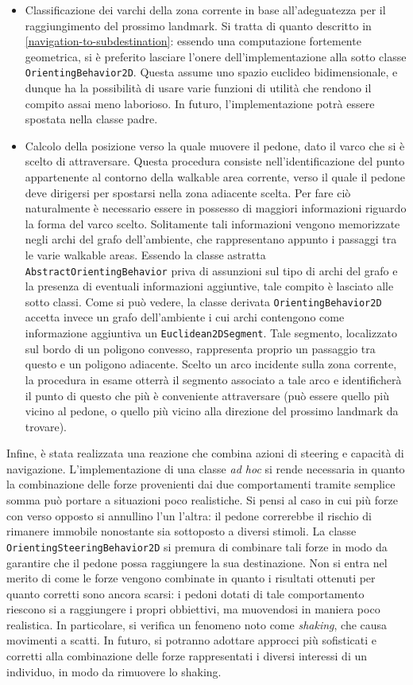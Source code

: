 \documentclass[12pt,a4paper,openright,oneside]{book}
\begin{document}
\begin{itemize}
    \item Classificazione dei varchi della zona corrente in base all'adeguatezza per il raggiungimento del prossimo landmark. Si tratta di quanto descritto in \ref{navigation-to-subdestination}: essendo una computazione fortemente geometrica, si è preferito lasciare l'onere dell'implementazione alla sotto classe \texttt{OrientingBehavior2D}. Questa assume uno spazio euclideo bidimensionale, e dunque ha la possibilità di usare varie funzioni di utilità che rendono il compito assai meno laborioso. In futuro, l'implementazione potrà essere spostata nella classe padre.
    \item Calcolo della posizione verso la quale muovere il pedone, dato il varco che si è scelto di attraversare. Questa procedura consiste nell'identificazione del punto appartenente al contorno della walkable area corrente, verso il quale il pedone deve dirigersi per spostarsi nella zona adiacente scelta. Per fare ciò naturalmente è necessario essere in possesso di maggiori informazioni riguardo la forma del varco scelto. Solitamente tali informazioni vengono memorizzate negli archi del grafo dell'ambiente, che rappresentano appunto i passaggi tra le varie walkable areas. Essendo la classe astratta \texttt{AbstractOrientingBehavior} priva di assunzioni sul tipo di archi del grafo e la presenza di eventuali informazioni aggiuntive, tale compito è lasciato alle sotto classi. Come si può vedere, la classe derivata \texttt{OrientingBehavior2D} accetta invece un grafo dell'ambiente i cui archi contengono come informazione aggiuntiva un \texttt{Euclidean2DSegment}. Tale segmento, localizzato sul bordo di un poligono convesso, rappresenta proprio un passaggio tra questo e un poligono adiacente. Scelto un arco incidente sulla zona corrente, la procedura in esame otterrà il segmento associato a tale arco e identificherà il punto di questo che più è conveniente attraversare (può essere quello più vicino al pedone, o quello più vicino alla direzione del prossimo landmark da trovare).
\end{itemize}
Infine, è stata realizzata una reazione che combina azioni di steering e capacità di navigazione. L'implementazione di una classe \emph{ad hoc} si rende necessaria in quanto la combinazione delle forze provenienti dai due comportamenti tramite semplice somma può portare a situazioni poco realistiche. Si pensi al caso in cui più forze con verso opposto si annullino l'un l'altra: il pedone correrebbe il rischio di rimanere immobile nonostante sia sottoposto a diversi stimoli. La classe \texttt{OrientingSteeringBehavior2D} si premura di combinare tali forze in modo da garantire che il pedone possa raggiungere la sua destinazione. Non si entra nel merito di come le forze vengono combinate in quanto i risultati ottenuti per quanto corretti sono ancora scarsi: i pedoni dotati di tale comportamento riescono si a raggiungere i propri obbiettivi, ma muovendosi in maniera poco realistica. In particolare, si verifica un fenomeno noto come \emph{shaking}, che causa movimenti a scatti. In futuro, si potranno adottare approcci più sofisticati e corretti alla combinazione delle forze rappresentati i diversi interessi di un individuo, in modo da rimuovere lo shaking.
\end{document}
